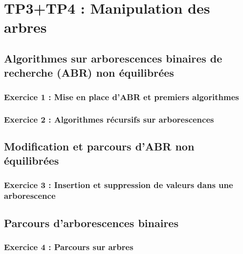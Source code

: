 \chapter{TP3+TP4 : Manipulation des arbres}

\section{Algorithmes sur arborescences binaires de recherche (ABR) non équilibrées}

\subsection{Exercice 1 : Mise en place d’ABR et premiers algorithmes}

\subsection{Exercice 2 : Algorithmes récursifs sur arborescences}

\section{Modification et parcours d’ABR non équilibrées}

\subsection{Exercice 3 : Insertion et suppression de valeurs dans une arborescence}

\section{Parcours d’arborescences binaires}

\subsection{Exercice 4 : Parcours sur arbres}
